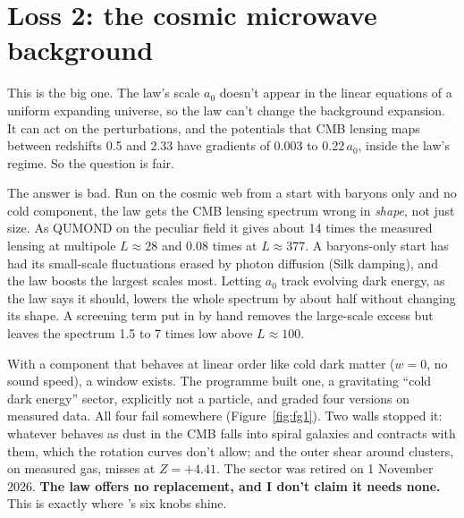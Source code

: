 


\section{Loss 2: the cosmic microwave background}

This is the big one. The law's scale $a_0$ doesn't appear in the linear equations of a uniform expanding universe, so the law can't change the background expansion. It can act on the perturbations, and the potentials that CMB lensing maps between redshifts 0.5 and 2.33 have gradients of 0.003 to 0.22\,$a_0$, inside the law's regime. So the question is fair.

The answer is bad. Run on the cosmic web from a start with baryons only and no cold component, the law gets the CMB lensing spectrum wrong in \emph{shape}, not just size. As QUMOND on the peculiar field it gives about 14 times the measured lensing at multipole $L\approx28$ and 0.08 times at $L\approx377$. A baryons-only start has had its small-scale fluctuations erased by photon diffusion (Silk damping), and the law boosts the largest scales most. Letting $a_0$ track evolving dark energy, as the law says it should, lowers the whole spectrum by about half without changing its shape. A screening term put in by hand removes the large-scale excess but leaves the spectrum 1.5 to 7 times low above $L\approx100$.


\begin{honestbox}
With a component that behaves at linear order like cold dark matter ($w=0$, no sound speed), a window exists. The programme built one, a gravitating ``cold dark energy'' sector, explicitly not a particle, and graded four versions on measured data. All four fail somewhere (Figure~\ref{fig:fg1}). Two walls stopped it: whatever behaves as dust in the CMB falls into spiral galaxies and contracts with them, which the rotation curves don't allow; and the outer shear around clusters, on measured gas, misses at $Z=+4.41$. The sector was retired on 1 November 2026. \textbf{The law offers no replacement, and I don't claim it needs none.} This is exactly where \LCDM's six knobs shine.
\end{honestbox}

